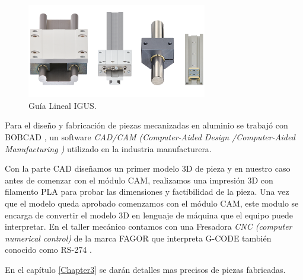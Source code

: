 \begin{figure}[ht]
\centering 
\includegraphics[width=0.7\textwidth]{./Figures/guias.png}
\caption{Guía Lineal IGUS.}
\label{fig:equipo_mecánico}
\end{figure}

Para el diseño y fabricación de piezas mecanizadas en aluminio se trabajó con BOBCAD \citep{web_bobcad}, un software \textit{CAD/CAM (Computer-Aided Design /Computer-Aided Manufacturing )} utilizado en la industria manufacturera. 

Con la parte CAD diseñamos un primer modelo 3D de pieza y en nuestro caso antes de comenzar con el módulo CAM, realizamos  una impresión 3D con filamento PLA para probar las dimensiones y factibilidad de la pieza.
Una vez que el modelo queda aprobado comenzamos con el módulo CAM, este modulo se encarga de convertir el modelo 3D en lenguaje de máquina que el equipo puede interpretar. En el taller mecánico contamos con una Fresadora \textit{ CNC (computer numerical control)} de la marca FAGOR \citep{web_fagor} que interpreta G-CODE también conocido como RS-274 \citep{web_gcode}. 

En el capítulo \ref{Chapter3} se darán detalles mas precisos de piezas fabricadas.
 




